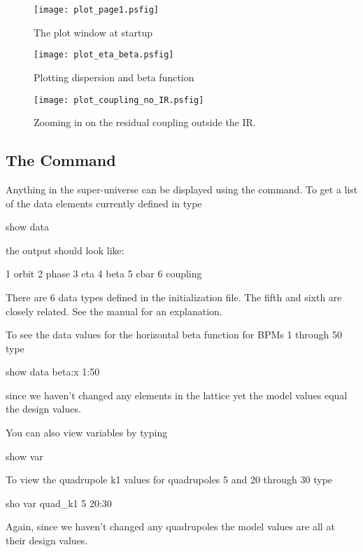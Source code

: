 \begin{figure}
  \centering
  \texttt{[image: plot\_page1.psfig]}
  \caption{The plot window at startup}
  \label{f:plot_begin}
\end{figure}

\begin{figure}
  \centering
  \texttt{[image: plot\_eta\_beta.psfig]}
  \caption{Plotting dispersion and beta function}
  \label{f:plot_eta_beta}
\end{figure}

\begin{figure}
  \centering
  \texttt{[image: plot\_coupling\_no\_IR.psfig]}
  \caption{Zooming in on the residual coupling outside the IR.}
  \label{f:plot_coupling_no_IR}
\end{figure}

\subsection{The  Command}

Anything in the super-universe can be displayed using the  command. To
get a list of the data elements currently defined in \tao type
\begin{example}
  show data
\end{example}
the output should look like:
\begin{example}
   1  orbit
   2  phase
   3  eta
   4  beta
   5  cbar
   6  coupling
\end{example}
There are 6 data types defined in the initialization file. The fifth and sixth are 
closely related. See the manual for an explanation.

To see the data values for the horizontal beta function for \cesr BPMs 1 through
50 type
\begin{example}
  show data beta:x 1:50
\end{example}
since we haven't changed any elements in the lattice yet the model values equal
the design values.

You can also view variables by typing
\begin{example}
  show var
\end{example}
To view the quadrupole k1 values for \cesr quadrupoles 5  and 20 through 30 type
\begin{example}
  sho var quad\_k1 5 20:30
\end{example}
Again, since we haven't changed any quadrupoles the model values are all at their
design values.

